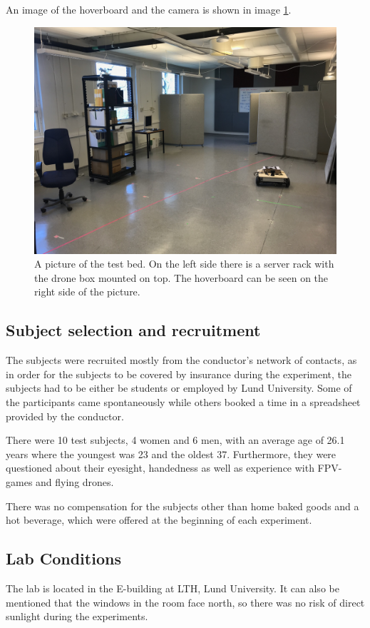 \documentclass[nofilelist]{cslthse-msc}
\begin{document}
An image of the hoverboard and the camera is shown in image \ref{fig:real-exp}.

\begin{figure}[!hbt]
   \centering
   \includegraphics[scale=0.1]{images/testbed.jpg} 
   \caption{A picture of the test bed. On the left side there is a server rack with the drone box mounted on top. The hoverboard can be seen on the right side of the picture.}
   \label{fig:real-exp}
\end{figure}

\subsection{Subject selection and recruitment}
The subjects were recruited mostly from the conductor's network of contacts, as in order for the subjects to be covered by insurance during the experiment, the subjects had to be either be students or employed by Lund University. Some of the participants came spontaneously while others booked a time in a spreadsheet provided by the conductor.

There were 10 test subjects, 4 women and 6 men, with an average age of 26.1 years where the youngest was 23 and the oldest 37. Furthermore, they were questioned about their eyesight, handedness as well as experience with FPV-games and flying drones.

There was no compensation for the subjects other than home baked goods and a hot beverage, which were offered at the beginning of each experiment. 

\subsection{Lab Conditions}
The lab is located in the E-building at LTH, Lund University. It can also be mentioned that the windows in the room face north, so there was no risk of direct sunlight during the experiments.
\end{document}
